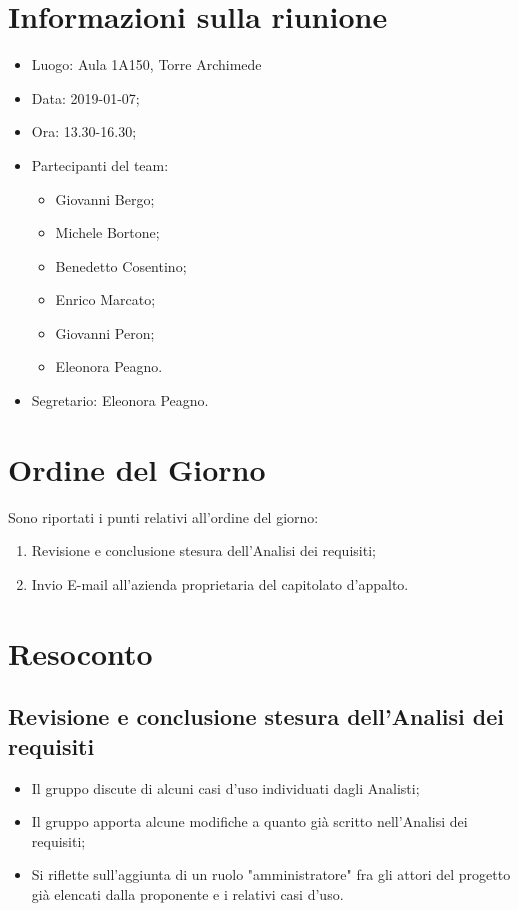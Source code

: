 \documentclass[11pt,a4paper]{article}
\begin{document}
	\section{Informazioni sulla riunione}
	\begin{itemize}
		\item Luogo: Aula 1A150, Torre Archimede
		\item Data: 2019-01-07;
		\item Ora: 13.30-16.30;
		\item Partecipanti del team:
			\begin{itemize}
				\item Giovanni Bergo;
				\item Michele Bortone;
				\item Benedetto Cosentino;
				\item Enrico Marcato;
				\item Giovanni Peron;
				\item Eleonora Peagno.
			\end{itemize}
		\item Segretario: Eleonora Peagno.
	\end{itemize}
	
	\section{Ordine del Giorno}
	Sono riportati i punti relativi all'ordine del giorno:
	\begin{enumerate}
		\item Revisione e conclusione stesura dell'Analisi dei requisiti;
		\item Invio E-mail all'azienda proprietaria del capitolato d'appalto.
	\end{enumerate}
	
	\section{Resoconto}
	\subsection{Revisione e conclusione stesura dell'Analisi dei requisiti}
	\begin{itemize}
		\item Il gruppo discute di alcuni casi d'uso individuati dagli Analisti;
		\item Il gruppo apporta alcune modifiche a quanto già scritto nell'Analisi dei requisiti;
		\item Si riflette sull'aggiunta di un ruolo "amministratore" fra gli attori del progetto già elencati dalla proponente e i relativi casi d'uso.
	\end{itemize}
\end{document}
